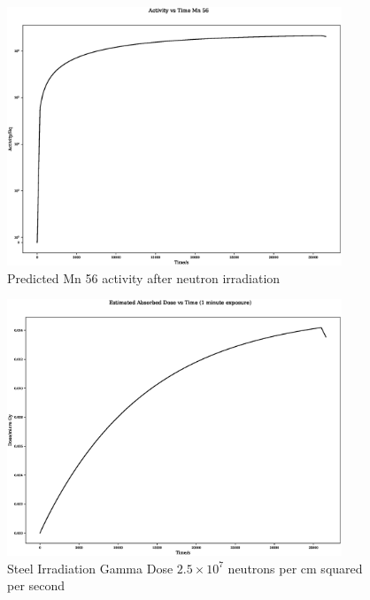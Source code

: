 \begin{figure}
  \begin{center}
    \includegraphics[width=10.0cm]{chapters/consequences_of_ionizing_radiation/neutron_plots/1/25_Mn_56_activity.eps}
    \caption{Predicted Mn 56 activity after neutron irradiation}
    \label{fig:mn56activity}
  \end{center}
\end{figure}

\begin{figure}
  \begin{center}
    \includegraphics[width=10.0cm]{chapters/consequences_of_ionizing_radiation/neutron_plots/1/gamma_dose.eps}
    \caption{Steel Irradiation Gamma Dose $2.5 \times 10^7$ neutrons per cm squared per second}
    \label{fig:neutron_irradiated_steel_dose1}
  \end{center}
\end{figure}


